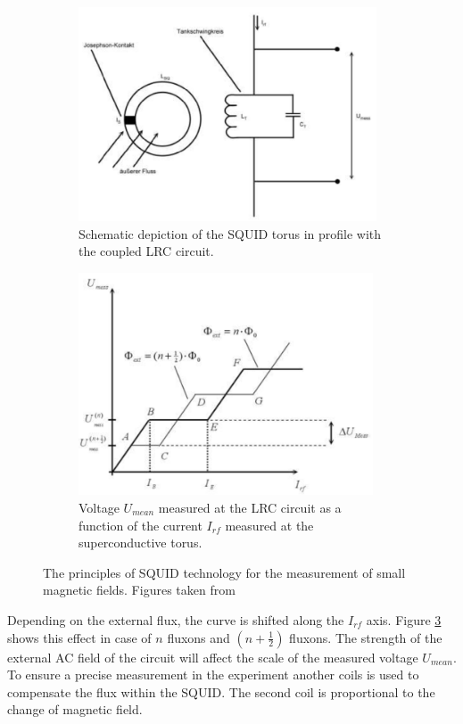 \documentclass[paper=a4, fontsize=10pt]{scrartcl}
\begin{document}
\begin{figure}[h!] 
	\centering
	   \begin{subfigure}[t]{0.5\textwidth}
 	       \centering
	       \includegraphics[height=2.5in]{img/SQUID2}
       	       \caption{Schematic depiction of the SQUID torus in
                 profile with the coupled LRC circuit.}
 	       \label{fig:SQUID}
    \end{subfigure}
	  \begin{subfigure}[t]{0.5\textwidth}
	        \centering
	        \includegraphics[height=2.6in]{img/SQUID}
 	        \caption{Voltage $U_{mean}$ measured at the LRC
                  circuit as a function of the current $I_{rf}$
                  measured at the superconductive torus.}
	 	\label{fig:SQUID2}
	  \end{subfigure}
          \caption{The principles of SQUID technology for the
            measurement of small magnetic fields. Figures taken from
            \citep{SQUID}}
\end{figure}

Depending on the external flux, the curve is shifted along the
$I_{rf}$ axis. Figure \ref{fig:SQUID2} shows this effect in case of
$n$ fluxons and $(n+\frac{1}{2})$ fluxons. The strength of the
external AC field of the circuit will affect the scale of the measured
voltage $U_{mean}$. To ensure a precise measurement in the experiment
another coils is used to compensate the flux within the SQUID. The
second coil is proportional to the change of magnetic field.
\end{document}
